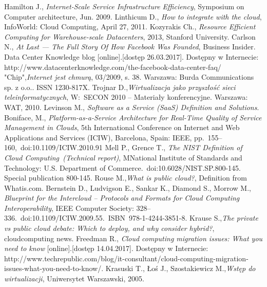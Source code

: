 \documentclass[10pt,a4paper,titlepage,twoside]{report}
\begin{document}
\begin{thebibliography}{99}
Hamilton J., \textit{Internet-Scale Service Infrastructure Efficiency}, Symposium on Computer architecture, Jun. 2009.
Linthicum D., \textit{How to integrate with the cloud}, InfoWorld: Cloud Computing, April 27, 2011.
Kozyrakis Ch., \textit{Resource Efficient Computing for Warehouse-scale Datacenters}, 2013, Stanford University.
Carlson N., \textit{At Last — The Full Story Of How Facebook Was Founded}, Business Insider.
Data Center Knowledge blog [online].[dostęp 26.03.2017]. Dostępny w Internecie: http://www.datacenterknowledge.com/the-facebook-data-center-faq/
"Chip",\textit{Internet jest chmurą}, 03/2009, s. 38. Warszawa: Burda Communications sp. z o.o.. ISSN 1230-817X.
Trojnar D.,\textit{Wirtualizacja jako przyszłość sieci teleinformatycznych}, W: SECON 2010 – Materiały konferencyjne. Warszawa: WAT, 2010.
Levinson M., \textit{Software as a Service (SaaS) Definition and Solutions}.
Boniface, M., \textit{Platform-as-a-Service Architecture for Real-Time Quality of Service Management in Clouds}, 5th International Conference on Internet and Web Applications and Services (ICIW), Barcelona, Spain: IEEE, pp. 155–160, doi:10.1109/ICIW.2010.91
Mell P., Grence T., \textit{The NIST Definition of Cloud Computing (Technical report)}, MNational Institute of Standards and Technology: U.S. Department of Commerce. doi:10.6028/NIST.SP.800-145. Special publication 800-145.
Rouse M.,\textit{What is public cloud?}, Definition from Whatis.com.
Bernstein D., Ludvigson E., Sankar K., Diamond S., Morrow M., \textit{Blueprint for the Intercloud – Protocols and Formats for Cloud Computing Interoperability}, IEEE Computer Society: 328–336. doi:10.1109/ICIW.2009.55. ISBN 978-1-4244-3851-8.
Krause S.,\textit{The private vs public cloud debate: Which to deploy, and why consider hybrid?}, cloudcomputing news.
Freedman R., \textit{Cloud computing migration issues: What you need to know} [online].[dostęp 14.04.2017]. Dostępny w Internecie: http://www.techrepublic.com/blog/it-consultant/cloud-computing-migration-issues-what-you-need-to-know/.
Krasuski T., Łoś J., Szostakiewicz M.,\textit{Wstęp do wirtualizacji}, Uniwersytet Warszawski, 2005.

\end{thebibliography}

\end{document}
